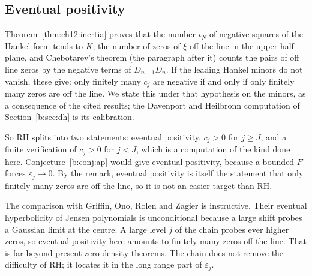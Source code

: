 \subsection{Eventual positivity}

\begin{remark}\label{b:rem:eventual}
Theorem~\ref{thm:ch12:inertia} proves that the number $\iota_N$ of negative squares of the Hankel form tends to $K$, the number of zeros of $\xi$ off the line in the upper half plane, and Chebotarev's theorem (the paragraph after it) counts the pairs of off line zeros by the negative terms of $D_{n-1}D_n$. If the leading Hankel minors do not vanish, these give: only finitely many $c_j$ are negative if and only if only finitely many zeros are off the line. We state this under that hypothesis on the minors, as a consequence of the cited results; the Davenport and Heilbronn computation of Section~\ref{b:sec:dh} is its calibration.
\end{remark}

So RH splits into two statements: eventual positivity, $c_j>0$ for $j\ge J$, and a finite verification of $c_j>0$ for $j<J$, which is a computation of the kind done here. Conjecture~\ref{b:conj:ap} would give eventual positivity, because a bounded $F$ forces $\varepsilon_j\to0$. By the remark, eventual positivity is itself the statement that only finitely many zeros are off the line, so it is not an easier target than RH.

The comparison with Griffin, Ono, Rolen and Zagier \cite{GORZ19} is instructive. Their eventual hyperbolicity of Jensen polynomials is unconditional because a large shift probes a Gaussian limit at the centre. A large level $j$ of the chain probes ever higher zeros, so eventual positivity here amounts to finitely many zeros off the line. That is far beyond present zero density theorems. The chain does not remove the difficulty of RH; it locates it in the long range part of $\varepsilon_j$.

